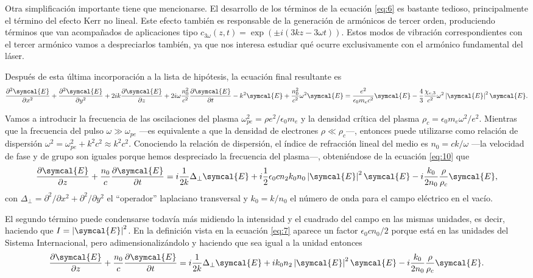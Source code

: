 \documentclass{scrartcl} %
\newcommand*{\pdv}[2]{\frac{\partial#1}{\partial#2}}
\newcommand*{\pdvN}[3]{\frac{\partial^{#3}#1}{\partial{#2}^{#3}}}
\newcommand*{\laplacian}{\Delta}
\newcommand*{\abs}[1]{\left|#1\right|}
\begin{document}
Otra simplificación importante tiene que mencionarse. El desarrollo de los términos de la ecuación \eqref{eq:6} es bastante tedioso, principalmente el término del efecto Kerr no lineal. Este efecto también es responsable de la generación de armónicos de tercer orden, produciendo términos que van acompañados de aplicaciones tipo $c_{3 \omega}(z,t)=\exp(\pm i(3kz - 3 \omega t))$. Estos modos de vibración correspondientes con el tercer armónico vamos a despreciarlos también, ya que nos interesa estudiar qué ocurre exclusivamente con el armónico fundamental del láser.

Después de esta última incorporación a la lista de hipótesis, la ecuación final resultante es
\begin{equation}\label{eq:10}
  \pdvN{\symcal{E}}{x}{2} + \pdvN{\symcal{E}}{y}{2} + 2ik \pdv{\symcal{E}}{z} + 2i \omega\frac{n^{2}_{0}}{c^{2}} \pdv{\symcal{E}}{t} - k^{2}\symcal{E} + \frac{n^{2}_{0}}{c^{2}} \omega^{2}\symcal{E} = \frac{e^{2}}{\epsilon_{0}m_{e}c^{2}}\symcal{E} - \frac{4}{3}\frac{\chi_{e,3}}{c^{2}} \omega^{2}\abs{\symcal{E}}^{2}\symcal{E}.
\end{equation}

Vamos a introducir la frecuencia de las oscilaciones del plasma $\omega^{2}_{pe} = \rho e^{2} / \epsilon_{0}m_{e}$ y la densidad crítica del plasma $\rho_{c} = \epsilon_{0}m_{e} \omega^{2} / e^{2}$. Mientras que la frecuencia del pulso $\omega \gg \omega_{pe}$ ---es equivalente a que la densidad de electrones $\rho \ll \rho_{c}$---, entonces puede utilizarse como relación de dispersión $\omega^{2} = \omega^{2}_{pe} + k^{2}c^{2} \approx k^{2}c^{2}$. Conociendo la relación de dispersión, el índice de refracción lineal del medio es $n_{0} = ck/\omega$ ---la velocidad de fase y de grupo son iguales porque hemos despreciado la frecuencia del plasma---, obteniéndose de la ecuación \eqref{eq:10} que
\begin{equation}\label{eq:11}
  \pdv{\symcal{E}}{z}  + \frac{n_{0}}{c} \pdv{\symcal{E}}{t} = i \frac{1}{2k} \laplacian_{\perp}\symcal{E} + i \frac{1}{2} \epsilon_{0}cn_{2}k_{0}n_{0} \abs{\symcal{E}}^{2}\symcal{E} - i \frac{k_{0}}{2n_{0}}\frac{\rho}{\rho_{c}} \symcal{E},
\end{equation}
con $\laplacian_{\perp} = \partial^{2}/\partial x^{2} + \partial^{2}/\partial y^{2}$ el \enquote{operador} laplaciano transversal y $k_{0} = k/n_{0}$ el número de onda para el campo eléctrico en el vacío.

El segundo término puede condensarse todavía más midiendo la intensidad y el cuadrado del campo en las mismas unidades, es decir, haciendo que $I = \abs{\symcal{E}}^{2}$. En la definición vista en la ecuación \eqref{eq:7} aparece un factor $\epsilon_{0}cn_{0}/2$ porque está en las unidades del Sistema Internacional, pero adimensionalizándolo y haciendo que sea igual a la unidad entonces
\begin{equation}\label{eq:12}
  \pdv{\symcal{E}}{z} + \frac{n_{0}}{c} \pdv{\symcal{E}}{t} = i \frac{1}{2k} \laplacian_{\perp}\symcal{E} + i k_{0}n_{2}\abs{\symcal{E}}^{2}\symcal{E} - i \frac{k_{0}}{2n_{0}}\frac{\rho}{\rho_{c}} \symcal{E}.
\end{equation}
\end{document}
